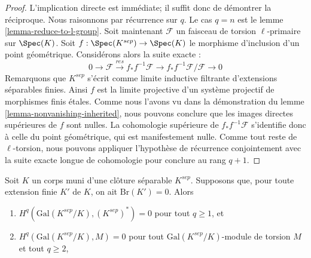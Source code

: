 \begin{proof}
L'implication directe est imm\'ediate; il suffit donc de d\'emontrer la r\'eciproque.
Nous raisonnons par r\'ecurrence sur $q$. Le cas $q = n$ est le
lemme \ref{lemma-reduce-to-l-group}. Soit maintenant
$\mathcal{F}$ un faisceau de torsion $\ell$-primaire sur $\Spec(K)$.
Soit $f : \Spec(K^{sep}) \rightarrow \Spec(K)$
le morphisme d'inclusion d'un point g\'eom\'etrique.
Consid\'erons alors la suite exacte :
$$
0 \rightarrow \mathcal{F} \xrightarrow{res}
f_* f^{-1} \mathcal{F} \rightarrow f_* f^{-1} \mathcal{F}/\mathcal{F} 
\rightarrow 0
$$
Remarquons que $K^{sep}$ s'\'ecrit comme limite inductive filtrante d'extensions
s\'eparables finies. Ainsi $f$
est la limite projective d'un syst\`eme projectif de morphismes finis \'etales.
Comme nous l'avons vu dans la d\'emonstration du
lemme \ref{lemma-nonvanishing-inherited}, nous pouvons conclure que les
images directes sup\'erieures de $f$ sont nulles. La cohomologie sup\'erieure de
$f_* f^{-1} \mathcal{F}$ s'identifie donc \`a celle du point g\'eom\'etrique, qui
est manifestement nulle. Comme tout reste de $\ell$-torsion, nous pouvons appliquer
l'hypoth\`ese de r\'ecurrence conjointement avec la suite exacte longue de cohomologie
pour conclure au rang $q + 1$.
\end{proof}

\begin{proposition}
\label{proposition-serre-galois}
\begin{reference}
\cite[Chapter II, Section 3, Proposition 5]{SerreGaloisCohomology}
\end{reference}
Soit $K$ un corps muni d'une clôture séparable $K^{sep}$.
Supposons que, pour toute extension finie $K'$ de $K$, on ait
$\text{Br}(K') = 0$. Alors
\begin{enumerate}
\item $H^q(\text{Gal}(K^{sep}/K), (K^{sep})^*) = 0$
pour tout $q \geq 1$, et
\item $H^q(\text{Gal}(K^{sep}/K), M) = 0$
pour tout $\text{Gal}(K^{sep}/K)$-module de torsion $M$ et tout $q \geq 2$,
\end{enumerate}
\end{proposition}

